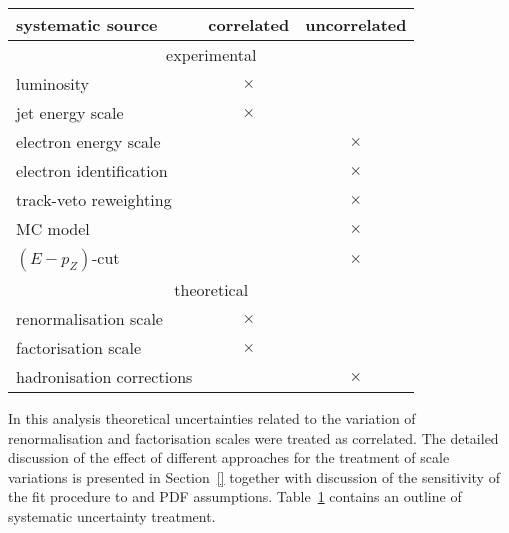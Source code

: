 \begin{table}[t]
\centering
\begin{tabular}{|l|c|c|}
\hline
 systematic source & correlated & uncorrelated \\
\hline
\multicolumn{3}{c}{experimental}\\
\hline
 luminosity & $\times$ & \\
 jet energy scale & $\times$ & \\
\hline
 electron energy scale & & $\times$  \\
 electron identification & & $\times$ \\
 track-veto reweighting & & $\times$ \\
 MC model & & $\times$ \\
 $\left(E-p_Z\right)$-cut & & $\times$ \\
\hline
\multicolumn{3}{c}{theoretical}\\
\hline
 renormalisation scale & $\times$ & \\
 factorisation scale & $\times$ & \\
 hadronisation corrections & & $\times$ \\
\hline
\end{tabular}
\label{tab:correlsyst} 
\end{table}

In this analysis theoretical uncertainties related to the variation of renormalisation and factorisation scales were treated as correlated. The detailed discussion of the effect of different approaches for the treatment of scale variations is presented in Section~\ref{} together with discussion of the sensitivity of the fit procedure to \asz and PDF assumptions. Table~\ref{tab:correlsyst} contains an outline of systematic uncertainty treatment.
